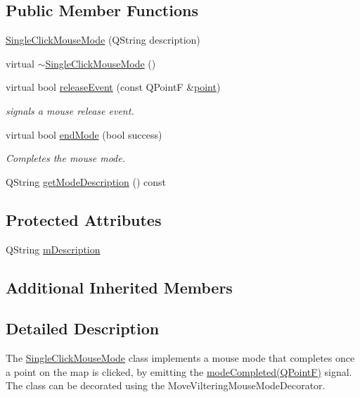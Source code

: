\subsection*{Public Member Functions}
\begin{DoxyCompactItemize}
\item 
\mbox{\hyperlink{class_single_click_mouse_mode_a2a07a84a491733658738db296b8e83ab}{Single\+Click\+Mouse\+Mode}} (Q\+String description)
\item 
virtual \mbox{\hyperlink{class_single_click_mouse_mode_a7bb5dbafd5e48e6f8e5e813e1f084d78}{$\sim$\+Single\+Click\+Mouse\+Mode}} ()
\item 
virtual bool \mbox{\hyperlink{class_single_click_mouse_mode_a182c0fae56fb11784de5f7f1a5a21234}{release\+Event}} (const Q\+PointF \&\mbox{\hyperlink{diffusion_8cpp_a380468221cb8294f9329d11c99c4da30}{point}})
\begin{DoxyCompactList}\small\item\em signals a mouse release event. \end{DoxyCompactList}\item 
virtual bool \mbox{\hyperlink{class_single_click_mouse_mode_a37735155f310a47896f8a0459da0f6e7}{end\+Mode}} (bool success)
\begin{DoxyCompactList}\small\item\em Completes the mouse mode. \end{DoxyCompactList}\item 
Q\+String \mbox{\hyperlink{class_single_click_mouse_mode_a135c1060f9c167ea441c9b257bd1fbc3}{get\+Mode\+Description}} () const
\end{DoxyCompactItemize}
\subsection*{Protected Attributes}
\begin{DoxyCompactItemize}
\item 
Q\+String \mbox{\hyperlink{class_single_click_mouse_mode_af1f7ce39684956992017e32362742254}{m\+Description}}
\end{DoxyCompactItemize}
\subsection*{Additional Inherited Members}


\subsection{Detailed Description}
The \mbox{\hyperlink{class_single_click_mouse_mode}{Single\+Click\+Mouse\+Mode}} class implements a mouse mode that completes once a point on the map is clicked, by emitting the \mbox{\hyperlink{class_single_click_mouse_mode_a0ff38b4cf1feb6d2d783eef5f0e68097}{mode\+Completed(\+Q\+Point\+F)}} signal. The class can be decorated using the Move\+Viltering\+Mouse\+Mode\+Decorator. 

